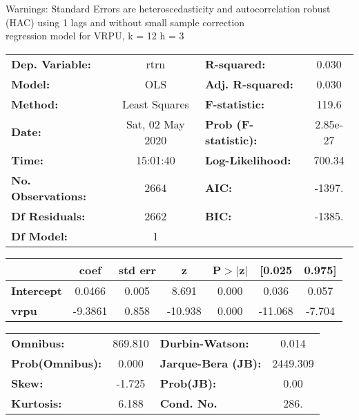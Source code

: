 Warnings: \newline
 [1] Standard Errors are heteroscedasticity and autocorrelation robust (HAC) using 1 lags and without small sample correction\\ 

regression model for VRPU, k = 12 h = 3\begin{center}
\begin{tabular}{lclc}
\toprule
\textbf{Dep. Variable:}    &       rtrn       & \textbf{  R-squared:         } &     0.030   \\
\textbf{Model:}            &       OLS        & \textbf{  Adj. R-squared:    } &     0.030   \\
\textbf{Method:}           &  Least Squares   & \textbf{  F-statistic:       } &     119.6   \\
\textbf{Date:}             & Sat, 02 May 2020 & \textbf{  Prob (F-statistic):} &  2.85e-27   \\
\textbf{Time:}             &     15:01:40     & \textbf{  Log-Likelihood:    } &    700.34   \\
\textbf{No. Observations:} &        2664      & \textbf{  AIC:               } &    -1397.   \\
\textbf{Df Residuals:}     &        2662      & \textbf{  BIC:               } &    -1385.   \\
\textbf{Df Model:}         &           1      & \textbf{                     } &             \\
\bottomrule
\end{tabular}
\begin{tabular}{lcccccc}
                   & \textbf{coef} & \textbf{std err} & \textbf{z} & \textbf{P$> |$z$|$} & \textbf{[0.025} & \textbf{0.975]}  \\
\midrule
\textbf{Intercept} &       0.0466  &        0.005     &     8.691  &         0.000        &        0.036    &        0.057     \\
\textbf{vrpu}      &      -9.3861  &        0.858     &   -10.938  &         0.000        &      -11.068    &       -7.704     \\
\bottomrule
\end{tabular}
\begin{tabular}{lclc}
\textbf{Omnibus:}       & 869.810 & \textbf{  Durbin-Watson:     } &    0.014  \\
\textbf{Prob(Omnibus):} &   0.000 & \textbf{  Jarque-Bera (JB):  } & 2449.309  \\
\textbf{Skew:}          &  -1.725 & \textbf{  Prob(JB):          } &     0.00  \\
\textbf{Kurtosis:}      &   6.188 & \textbf{  Cond. No.          } &     286.  \\
\bottomrule
\end{tabular}
\end{center}

